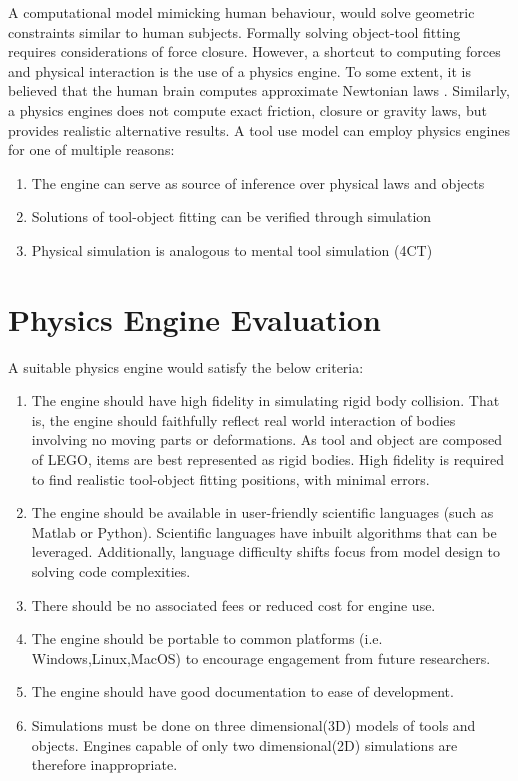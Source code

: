 \documentclass[11]{article}
\begin{document}
A computational model mimicking human behaviour, would solve geometric constraints similar to human subjects.
Formally solving object-tool fitting requires considerations of force closure.
However, a shortcut to computing forces and physical interaction is the use of a physics engine. 
To some extent, it is believed that the human brain computes approximate Newtonian laws \cite{battaglia2013}. 
Similarly, a physics engines does not compute exact friction, closure or gravity laws, but provides realistic alternative results. 
A tool use model can employ physics engines for one of multiple reasons:
\begin{enumerate}
\item The engine can serve as source of inference over physical laws and objects 
\item Solutions of tool-object fitting can be verified through simulation
\item Physical simulation is analogous to mental tool simulation (4CT)
\end{enumerate}

\section{Physics Engine Evaluation}

A suitable physics engine would satisfy the below criteria:
\begin{enumerate}
\item The engine should have high fidelity in simulating rigid body collision. 
That is, the engine should faithfully reflect real world interaction of bodies involving no moving parts or deformations.
As tool and object are composed of LEGO, items are best represented as rigid bodies.   
High fidelity is required to find realistic tool-object fitting positions, with minimal errors.
\item The engine should be available in user-friendly scientific languages (such as Matlab or Python). 
Scientific languages have inbuilt algorithms that can be leveraged.
Additionally, language difficulty shifts focus from model design to solving code complexities.
\item There should be no associated fees or reduced cost for engine use.
\item The engine should be portable to common platforms (i.e. Windows,Linux,MacOS) to encourage engagement from future researchers.
\item The engine should have good documentation to ease of development.
\item Simulations must be done on three dimensional(3D) models of tools and objects.
Engines capable of only two dimensional(2D) simulations are therefore inappropriate.  
\end{enumerate}
\end{document}

